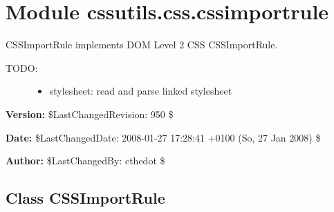 %
%
%


\section{Module cssutils.css.cssimportrule}

    \label{cssutils:css:cssimportrule}

CSSImportRule implements DOM Level 2 CSS CSSImportRule.
\begin{description}
\item[{TODO:}] \leavevmode \begin{itemize}
\item {} 
stylesheet: read and parse linked stylesheet

\end{itemize}

\end{description}
\textbf{Version:} \$LastChangedRevision: 950 \$



\textbf{Date:} \$LastChangedDate: 2008-01-27 17:28:41 +0100 (So, 27 Jan 2008) \$



\textbf{Author:} \$LastChangedBy: cthedot \$





\subsection{Class CSSImportRule}

